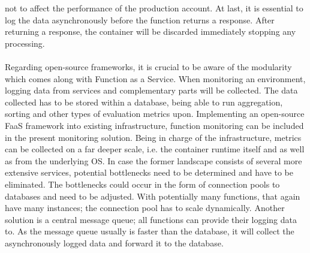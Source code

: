 \documentclass[a4paper,twoside,11pt, pagesize]{scrartcl}
\begin{document}
\begin{spacing}{1.2}
not to affect the performance of the production account. At last, it is essential to log the data asynchronously before the function returns a response. After returning a response, the container will be discarded immediately stopping any processing.\\\\ Regarding open-source frameworks, it is crucial to be aware of the modularity which comes along with Function as a Service. When monitoring an environment, logging data from services and complementary parts will be collected. The data collected has to be stored within a database, being able to run aggregation, sorting and other types of evaluation metrics upon. Implementing an open-source FaaS framework into existing infrastructure, function monitoring can be included in the present monitoring solution. Being in charge of the infrastructure, metrics can be collected on a far deeper scale, i.e. the container runtime itself and as well as from the underlying OS. In case the former landscape consists of several more extensive services, potential bottlenecks need to be determined and have to be eliminated. The bottlenecks could occur in the form of connection pools to databases and need to be adjusted. With potentially many functions, that again have many instances; the connection pool has to scale dynamically. Another solution is a central message queue; all functions can provide their logging data to. As the message queue usually is faster than the database, it will collect the asynchronously logged data and forward it to the database.

\end{spacing}
\end{document}
